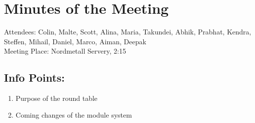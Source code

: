 
\section{Minutes of the Meeting}
\label{sec-1}
\noindent Attendees: Colin, Malte, Scott, Alina, Maria, Takundei, Abhik, Prabhat, Kendra, Steffen, Mihail, Daniel, Marco, Aiman, Deepak\\
\noindent Meeting Place: Nordmetall Servery, 2:15
\subsection{Info Points:}
\label{sec-1-1}
\begin{enumerate}
\item Purpose of the round table
\item Coming changes of the module system
\end{enumerate}
